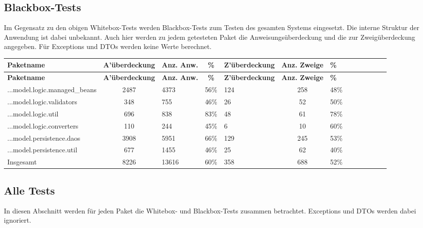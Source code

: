 \documentclass{article}
\begin{document}
\subsection{Blackbox-Tests}

Im Gegensatz zu den obigen Whitebox-Tests werden Blackbox-Tests zum Testen des gesamten Systems eingesetzt. Die interne Struktur der Anwendung ist dabei unbekannt. 
Auch hier werden zu jedem getesteten Paket die Anweisungsüberdeckung und die zur Zweigüberdeckung angegeben. 
Für Exceptions und DTOs werden keine Werte berechnet.

\begin{longtable}{@{}lclclclclclcl@{}}
\toprule
\textbf{Paketname} & \textbf{A'überdeckung} & \textbf{Anz. Anw.} & \textbf{\%} & \textbf{Z'überdeckung} & \textbf{Anz. Zweige} & \textbf{\%} \\* \midrule
\endfirsthead
\textbf{Paketname} & \textbf{A'überdeckung} & \textbf{Anz. Anw.} & \textbf{\%} & \textbf{Z'überdeckung} & \textbf{Anz. Zweige} & \textbf{\%} \\* \midrule
\endhead
...model.logic.managed\_beans 	& 2487 		& 4373 		& 56\% 		& 124 		& 258 		& 48\% \\
...model.logic.validators 		& 348 		& 755 		& 46\% 		& 26 			& 52 			& 50\% \\
...model.logic.util 			& 696 		& 838 		& 83\% 		& 48 			& 61 			& 78\% \\
...model.logic.converters 		& 110 		& 244 		& 45\% 		& 6 			& 10 			& 60\% \\
...model.persistence.daos 		& 3908 		& 5951 		& 66\% 		& 129 		& 245 		& 53\% \\
...model.persistence.util 		& 677 		& 1455 		& 46\% 		& 25 			& 62 			& 40\% \\
Insgesamt 						& 8226            	& 13616            & 60\%            	& 358            	& 688            	& 52\% \\* \bottomrule
\end{longtable}

\subsection{Alle Tests}

In diesen Abschnitt werden für jeden Paket die Whitebox- und Blackbox-Tests zusammen betrachtet. Exceptions und DTOs werden dabei ignoriert.
\end{document}
